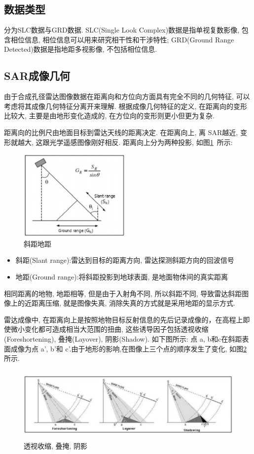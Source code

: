 \subsection{数据类型}
分为SLC数据与GRD数据. SLC(Single Look Complex)数据是指单视复数影像, 包含相位信息, 相位信息可以用来研究相干性和干涉特性; GRD(Ground Range Detected)数据是指地距多视影像, 不包括相位信息.

\subsection{SAR成像几何}
由于合成孔径雷达图像数据在距离向和方位向方面具有完全不同的几何特征, 可以考虑将其成像几何特征分离开来理解. 根据成像几何特征的定义, 在距离向的变形比较大, 主要是由地形变化造成的, 在方位向的变形则更小但更为复杂. 

距离向的比例尺由地面目标到雷达天线的距离决定. 在距离向上, 离 SAR越近, 变形就越大, 这跟光学遥感图像刚好相反. 距离向上分为两种投影, 如图\ref{fig:0108}~所示:
\begin{figure}[htbp]
    \centering
    \includegraphics[height=12em]{pic/chap01xx07.jpg}
    \caption{斜距地距}
    \label{fig:0108}
\end{figure}


\begin{itemize}
    \item 斜距(Slant range):雷达到目标的距离方向, 雷达探测斜距方向的回波信号
    \item 地距(Ground range):将斜距投影到地球表面, 是地面物体间的真实距离
\end{itemize}
相同距离的地物, 地距相等, 但是由于入射角不同, 所以斜距不同, 导致雷达斜距图像上的近距离压缩, 就是图像失真, 消除失真的方式就是采用地距的显示方式.

雷达成像中, 在距离向上是按照地物目标反射信息的先后记录成像的，在高程上即使微小变化都可造成相当大范围的扭曲, 这些诱导因子包括透视收缩(Foreshortening), 叠掩(Layover), 阴影(Shadow). 如下图所示: 点 a, b和c在斜距表面成像为点 a', b'和 c'.由于地形的影响,在图像上三个点的顺序发生了变化, 如图\ref{fig:0109}所示.
\begin{figure}[htbp]
    \centering
    \includegraphics[height=10em]{pic/chap01xx09.jpg}
    \caption{透视收缩, 叠掩, 阴影}
    \label{fig:0109}
\end{figure}